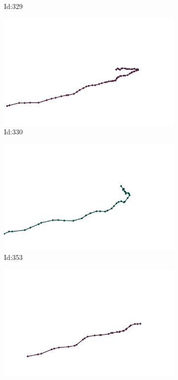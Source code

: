 \documentclass[12pt,twoside]{report}
\begin{document}
\begin{figure}
\begin{subfigure}[b]{0.20\textwidth}
\caption{Id:329}
\end{subfigure}
\begin{subfigure}[b]{0.20\textwidth}
\centering
\includegraphics[width=\textwidth]{../trajectories/330.png}
\caption{Id:330}
\end{subfigure}
\begin{subfigure}[b]{0.20\textwidth}
\centering
\includegraphics[width=\textwidth]{../trajectories/353.png}
\caption{Id:353}
\end{subfigure}
\begin{subfigure}[b]{0.20\textwidth}
\centering
\includegraphics[width=\textwidth]{../trajectories/358.png}

\end{subfigure}
\end{figure}
\end{document}

